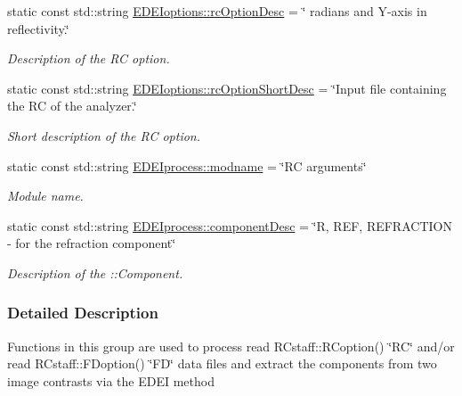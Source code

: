 \begin{DoxyCompactItemize}
$$static const std::string \hyperlink{group__edeiedei_ga4ca0ca5e3acea8517ed7806eca3b9f71}{EDEIoptions::rcOptionDesc} = \char`\"{} radians and Y-\/axis in reflectivity.\char`\"{}
\begin{DoxyCompactList}\small\item\em Description of the RC option. \item\end{DoxyCompactList}\item 
static const std::string \hyperlink{group__edeiedei_gaf8b9f6e9837dd2d85f8c01071a69b06e}{EDEIoptions::rcOptionShortDesc} = \char`\"{}Input file containing the RC of the analyzer.\char`\"{}
\begin{DoxyCompactList}\small\item\em Short description of the RC option. \item\end{DoxyCompactList}\item 
static const std::string \hyperlink{group__edeiedei_ga32645490331f1049ac7b8be12b72e9fd}{EDEIprocess::modname} = \char`\"{}RC arguments\char`\"{}
\begin{DoxyCompactList}\small\item\em Module name. \item\end{DoxyCompactList}\item 
static const std::string \hyperlink{group__edeiedei_ga6222a7fc19bf117145380f89e64292c8}{EDEIprocess::componentDesc} = \char`\"{}R, REF, REFRACTION -\/ for the refraction component\char`\"{}
\begin{DoxyCompactList}\small\item\em Description of the ::Component. \item\end{DoxyCompactList}\end{DoxyCompactItemize}


\subsubsection{Detailed Description}
Functions in this group are used to process read RCstaff::RCoption() \char`\"{}RC\char`\"{} and/or read RCstaff::FDoption() \char`\"{}FD\char`\"{} data files and extract the components from two image contrasts via the EDEI method 

